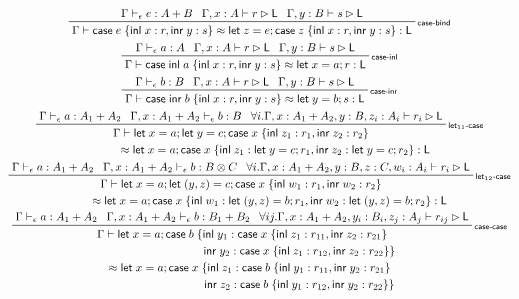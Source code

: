 \documentclass[acmsmall,screen,review]{acmart}
\newcommand{\ms}[1]{\ensuremath{\mathsf{#1}}}
\newcommand{\lto}{:}
\newcommand{\linl}[1]{\ms{inl}\;{#1}}
\newcommand{\linr}[1]{\ms{inr}\;{#1}}
\newcommand{\caseexpr}[5]{\ms{case}\;#1\;\{\linl{#2} \lto #3, \linr{#4} \lto #5\}}
\newcommand{\letstmt}[3]{\ensuremath{\ms{let}\;#1 = #2; #3}}
\newcommand{\casestmt}[5]{\ms{case}\;#1\;\{\linl{#2} \lto #3, \linr{#4} \lto #5\}}
\newcommand{\bhyp}[2]{#1 : #2}
\newcommand{\rle}[1]{{\scriptsize\textsf{#1}}}
\newcommand{\hasty}[4]{#1 \vdash_{#2} #3: {#4}}
\newcommand{\haslb}[3]{#1 \vdash #2 \rhd #3}
\newcommand{\teqv}{\approx}
\newcommand{\lbeq}[4]{#1 \vdash #2 \teqv #3 : {#4}}
\begin{document}
\begin{gather*}
  \prftree[r]{\rle{case-bind}}
    {\hasty{\Gamma}{\epsilon}{e}{A + B}}
    {\haslb{\Gamma, \bhyp{x}{A}}{r}{\ms{L}}}
    {\haslb{\Gamma, \bhyp{y}{B}}{s}{\ms{L}}}
    {\lbeq{\Gamma}{\caseexpr{e}{x}{r}{y}{s}}{\letstmt{z}{e}{\caseexpr{z}{x}{r}{y}{s}}}{\ms{L}}}
  \\
  \prftree[r]{\rle{case-inl}}
    {\hasty{\Gamma}{\epsilon}{a}{A}}
    {\haslb{\Gamma, \bhyp{x}{A}}{r}{\ms{L}}}
    {\haslb{\Gamma, \bhyp{y}{B}}{s}{\ms{L}}}
    {\lbeq{\Gamma}{\caseexpr{\linl{a}}{x}{r}{y}{s}}{\letstmt{x}{a}{r}}{\ms{L}}}
  \\
  \prftree[r]{\rle{case-inr}}
    {\hasty{\Gamma}{\epsilon}{b}{B}}
    {\haslb{\Gamma, \bhyp{x}{A}}{r}{\ms{L}}}
    {\haslb{\Gamma, \bhyp{y}{B}}{s}{\ms{L}}}
    {\lbeq{\Gamma}{\caseexpr{\linr{b}}{x}{r}{y}{s}}{\letstmt{y}{b}{s}}{\ms{L}}}
  \\
  \prftree[r]{\rle{let$_{11}$-case}}
    {\hasty{\Gamma}{\epsilon}{a}{A_1 + A_2}}
    {\hasty{\Gamma, \bhyp{x}{A_1 + A_2}}{\epsilon}{b}{B}}
    {
    \forall i. \haslb{\Gamma, \bhyp{x}{A_1 + A_2}, \bhyp{y}{B}, \bhyp{z_i}{A_i}}{r_i}{\ms{L}}
    }
    {
      \prfStackPremises
      {\Gamma \vdash \letstmt{x}{a}{\letstmt{y}{c}{\casestmt{x}{z_1}{r_1}{z_2}{r_2}}}}
      {\hspace{6em} \approx 
        \letstmt{x}{a}{\casestmt{x}{z_1}{\letstmt{y}{c}{r_1}}{z_2}{\letstmt{y}{c}{r_2}}} 
        : \ms{L}}
    }
  \\
  \prftree[r]{\rle{let$_{12}$-case}}
    {\hasty{\Gamma}{\epsilon}{a}{A_1 + A_2}}
    {\hasty{\Gamma, \bhyp{x}{A_1 + A_2}}{\epsilon}{b}{B \otimes C}}
    {
    \forall i. 
      \haslb{\Gamma, \bhyp{x}{A_1 + A_2}, \bhyp{y}{B}, \bhyp{z}{C}, \bhyp{w_i}{A_i}}{r_i}{\ms{L}}
    }
    {
      \prfStackPremises
      {\Gamma \vdash \letstmt{x}{a}{\letstmt{(y, z)}{c}{\casestmt{x}{w_1}{r_1}{w_2}{r_2}}}}
      {\hspace{5em} \approx 
        \letstmt{x}{a}{\casestmt{x}{w_1}{\letstmt{(y, z)}{b}{r_1}}{w_2}{\letstmt{(y, z)}{b}{r_2}}} 
        : \ms{L}}
    }
  \\
  \prftree[r]{\rle{case-case}}
    {\hasty{\Gamma}{\epsilon}{a}{A_1 + A_2}}
    {\hasty{\Gamma, \bhyp{x}{A_1 + A_2}}{\epsilon}{b}{B_1 + B_2}}
    {
    \forall i j. 
      \haslb{\Gamma, \bhyp{x}{A_1 + A_2}, \bhyp{y_i}{B_i}, \bhyp{z_j}{A_j}}{r_{ij}}{\ms{L}}
    }
    {
      \prfStackPremises
      {\Gamma \vdash \ms{let}\;x = a; \ms{case}\;b\;\{
        \linl{y_1} \lto \casestmt{x}{z_1}{r_{11}}{z_2}{r_{21}}
      }
      {
        \hspace{10em} \linr{y_2} \lto \casestmt{x}{z_1}{r_{12}}{z_2}{r_{22}}\}
      }
      {
        \hspace{1.3em} \approx \ms{let}\;x = a; \ms{case}\;x\;\{
        \linl{z_1} \lto \casestmt{b}{y_1}{r_{11}}{y_2}{r_{21}}
      }
      {
        \hspace{10em} \linr{z_2} \lto \casestmt{b}{y_1}{r_{12}}{y_2}{r_{22}}\}
      }
    }
\end{gather*}
\end{document}
